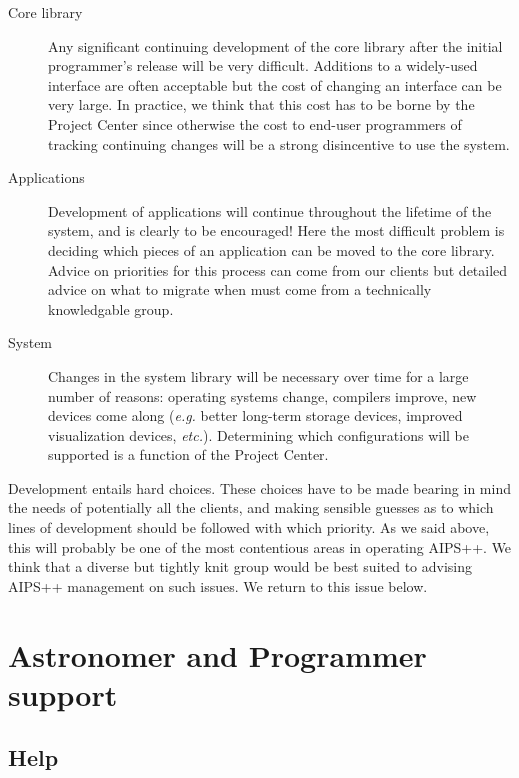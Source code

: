 \begin{description}
\item[Core library] Any significant continuing development of the core library
after the initial programmer's release will be very difficult.
Additions to a widely-used interface are often acceptable but the cost
of changing an interface can be very large. In practice, we think that
this cost has to be borne by the Project Center since otherwise the
cost to end-user programmers of tracking continuing changes will be a
strong disincentive to use the system.
\item[Applications] Development of applications will continue
throughout the lifetime of the system, and is clearly to be 
encouraged! Here the most difficult problem is deciding which 
pieces of an application can be moved to the core library.
Advice on priorities for this process can come from our clients
but detailed advice on what to migrate when must come from a
technically knowledgable group.
\item[System] Changes in the system library will be necessary over
time for a large number of reasons: operating systems change,
compilers improve, new devices come along ({\em e.g.} better long-term storage
devices, improved visualization devices, {\em etc.}). Determining which
configurations will be supported is a function of the Project Center.
\end{description}

Development entails hard choices. These choices have to be made
bearing in mind the needs of potentially all the clients, and making
sensible guesses as to which lines of development should be followed
with which priority. As we said above, this will probably be one of
the most contentious areas in operating AIPS++. We think that a
diverse but tightly knit group would be best suited to advising AIPS++
management on such issues.  We return to this issue below.

\section{Astronomer and Programmer support}

\subsection{Help}

